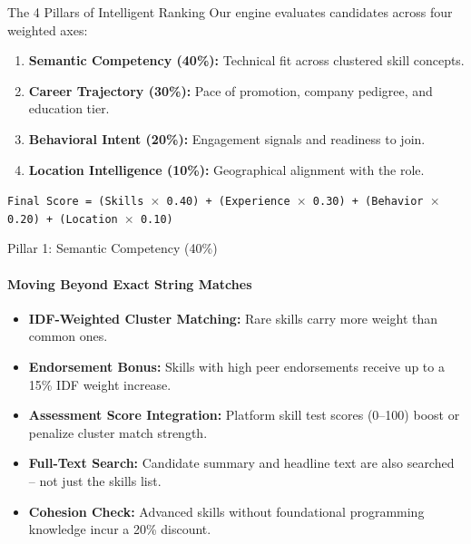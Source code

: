 \documentclass[aspectratio=169]{beamer}
\begin{document}
\begin{frame}{The 4 Pillars of Intelligent Ranking}
  Our engine evaluates candidates across four weighted axes:
  \begin{enumerate}
    \item \textbf{Semantic Competency (40\%):} Technical fit across clustered skill concepts.
    \item \textbf{Career Trajectory (30\%):} Pace of promotion, company pedigree, and education tier.
    \item \textbf{Behavioral Intent (20\%):} Engagement signals and readiness to join.
    \item \textbf{Location Intelligence (10\%):} Geographical alignment with the role.
  \end{enumerate}
  \vspace{1em}
  \begin{center}
    \texttt{Final Score = (Skills $\times$ 0.40) + (Experience $\times$ 0.30) + (Behavior $\times$ 0.20) + (Location $\times$ 0.10)}
  \end{center}
\end{frame}

\begin{frame}{Pillar 1: Semantic Competency (40\%)}
  \framesubtitle{Moving Beyond Exact String Matches}
  \begin{itemize}
    \item \textbf{IDF-Weighted Cluster Matching:} Rare skills carry more weight than common ones.
    \item \textbf{Endorsement Bonus:} Skills with high peer endorsements receive up to a 15\% IDF weight increase.
    \item \textbf{Assessment Score Integration:} Platform skill test scores (0--100) boost or penalize cluster match strength.
    \item \textbf{Full-Text Search:} Candidate summary and headline text are also searched -- not just the skills list.
    \item \textbf{Cohesion Check:} Advanced skills without foundational programming knowledge incur a 20\% discount.
  \end{itemize}
\end{frame}
\end{document}
